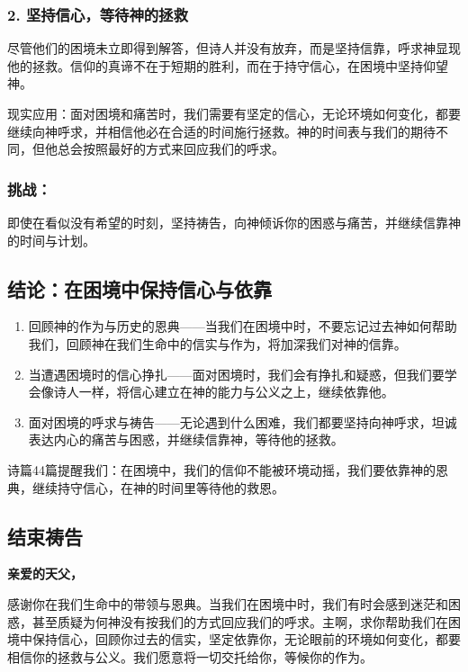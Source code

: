 \documentclass[a4paper, 12pt]{article}
\begin{document}
\subsubsection*{2. 坚持信心，等待神的拯救}
\hspace{0.6cm}尽管他们的困境未立即得到解答，但诗人并没有放弃，而是坚持信靠，呼求神显现他的拯救。信仰的真谛不在于短期的胜利，而在于持守信心，在困境中坚持仰望神。

现实应用：面对困境和痛苦时，我们需要有坚定的信心，无论环境如何变化，都要继续向神呼求，并相信他必在合适的时间施行拯救。神的时间表与我们的期待不同，但他总会按照最好的方式来回应我们的呼求。
\subsubsection*{挑战：}

即使在看似没有希望的时刻，坚持祷告，向神倾诉你的困惑与痛苦，并继续信靠神的时间与计划。
\subsection*{结论：在困境中保持信心与依靠}
\begin{enumerate}
    \item 回顾神的作为与历史的恩典——当我们在困境中时，不要忘记过去神如何帮助我们，回顾神在我们生命中的信实与作为，将加深我们对神的信靠。

    \item 当遭遇困境时的信心挣扎——面对困境时，我们会有挣扎和疑惑，但我们要学会像诗人一样，将信心建立在神的能力与公义之上，继续依靠他。

    \item 面对困境的呼求与祷告——无论遇到什么困难，我们都要坚持向神呼求，坦诚表达内心的痛苦与困惑，并继续信靠神，等待他的拯救。

\end{enumerate}



诗篇44篇提醒我们：在困境中，我们的信仰不能被环境动摇，我们要依靠神的恩典，继续持守信心，在神的时间里等待他的救恩。

\subsection*{结束祷告}
\textbf{亲爱的天父，}

感谢你在我们生命中的带领与恩典。当我们在困境中时，我们有时会感到迷茫和困惑，甚至质疑为何神没有按我们的方式回应我们的呼求。主啊，求你帮助我们在困境中保持信心，回顾你过去的信实，坚定依靠你，无论眼前的环境如何变化，都要相信你的拯救与公义。我们愿意将一切交托给你，等候你的作为。
\end{document}
